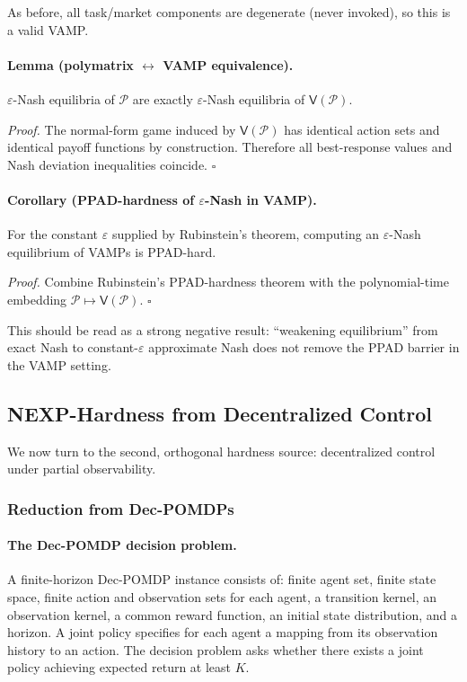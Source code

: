 As before, all task/market components are degenerate (never invoked), so this is a valid VAMP.

\paragraph{Lemma (polymatrix \(\leftrightarrow\) VAMP equivalence).}
\(\varepsilon\)-Nash equilibria of \(\mathcal P\) are exactly \(\varepsilon\)-Nash equilibria of \(\mathsf V(\mathcal P)\).

\emph{Proof.} The normal-form game induced by \(\mathsf V(\mathcal P)\) has identical action sets and identical payoff functions by construction. Therefore all best-response values and Nash deviation inequalities coincide. \(\square\)

\paragraph{Corollary (PPAD-hardness of \(\varepsilon\)-Nash in VAMP).}
For the constant \(\varepsilon\) supplied by Rubinstein's theorem, computing an \(\varepsilon\)-Nash equilibrium of VAMPs is PPAD-hard.

\emph{Proof.} Combine Rubinstein's PPAD-hardness theorem with the polynomial-time embedding \(\mathcal P\mapsto \mathsf V(\mathcal P)\). \(\square\)

This should be read as a strong negative result: ``weakening equilibrium'' from exact Nash to constant-\(\varepsilon\) approximate Nash does not remove the PPAD barrier in the VAMP setting.

\subsection{NEXP-Hardness from Decentralized Control}

We now turn to the second, orthogonal hardness source: decentralized control under partial observability.

\subsubsection{Reduction from Dec-POMDPs}

\paragraph{The Dec-POMDP decision problem.}
A finite-horizon Dec-POMDP instance consists of: finite agent set, finite state space, finite action and observation sets for each agent, a transition kernel, an observation kernel, a common reward function, an initial state distribution, and a horizon. A joint policy specifies for each agent a mapping from its observation history to an action. The decision problem asks whether there exists a joint policy achieving expected return at least \(K\).

